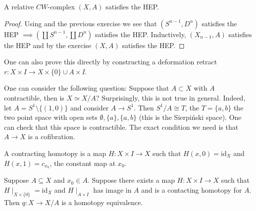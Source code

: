 \documentclass[ma3408.tex]{subfiles}
\begin{document}
\begin{Thm}
A relative $CW$-complex $(X,A)$ satisfies the HEP. 
\end{Thm}
\begin{proof}
Using  and the previous exercise we see that $(S^{n-1},D^n)$ satisfies the HEP $\implies (\coprod S^{n-1},\coprod D^n)$ satisfies the HEP. Inductively, $(X_{n-1},A)$ satisfies the HEP and by the exercise $(X,A)$ satisfies the HEP. 
\end{proof}
\begin{Rem}
One can also prove this directly by constructing a deformation retract $r \colon X \times I \to X \times \{ 0 \} \cup A \times I$. 
\end{Rem}
\begin{Rem}
One can consider the following question: Suppose that $A \subset X$ with $A$ contractible, then is $X \simeq X/A$? Surprisingly, this is not true in general. Indeed, let $A = S^1 \setminus \{ (1,0) \}$ and consider $A \to S^1$. Then $S^1/A \cong T$, the $T = \{ a ,b \}$ the two point space with open sets $\emptyset, \{ a \}, \{ a, b\}$ (this is the Sierpi\'nski space). One can check that this space is contractible. The exact condition we need is that $A \to X$ is a cofibration. 
\end{Rem}
\begin{Def}
A contracting homotopy is a map $H \colon X \times I \to X$ such that $H(x,0) = \text{id}_X$ and $H(x,1) = c_{x_0}$, the constant map at $x_0$. 
\end{Def}
\begin{Prop}\label{prop:quotient_contractible}
Suppose $A \subseteq X$ and $x_0 \in A$. Suppose there exists a map $H \colon X \times I \to X$ such that $H \mid_{X \times \{ 0 \}} = \text{id}_X$ and $H \mid_{A \times I}$ has image in $A$ and is a contacting homotopy for $A$. Then $q \colon X \to X/A$ is a homotopy equivalence. 
\end{Prop}
\end{document}

